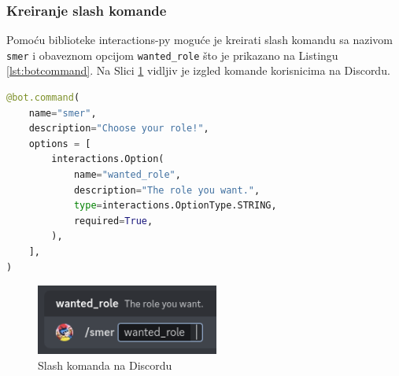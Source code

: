 \documentclass[a4paper,11pt]{article}
\begin{document}
\subsubsection{Kreiranje slash komande}
Pomoću biblioteke interactions-py moguće je kreirati slash komandu sa nazivom \texttt{smer} i obaveznom opcijom \texttt{wanted\_role} što je prikazano na Listingu \ref{lst:botcommand}. Na Slici \ref{fig:slashcommand} vidljiv je izgled komande korisnicima na Discordu.
\vfill
\begin{lstlisting}[language=Python, caption=Kreiranje slash komande, label=lst:botcommand]
@bot.command(
    name="smer",
    description="Choose your role!",
    options = [
        interactions.Option(
            name="wanted_role",
            description="The role you want.",
            type=interactions.OptionType.STRING,
            required=True,
        ),
    ],
)
\end{lstlisting}
\vfill
\begin{figure}[!htb]
    \centering
    \includegraphics[width=6cm]{slashcommand}
    \caption{Slash komanda na Discordu}
    \label{fig:slashcommand}
\end{figure}
\vfill
\newpage
\end{document}
